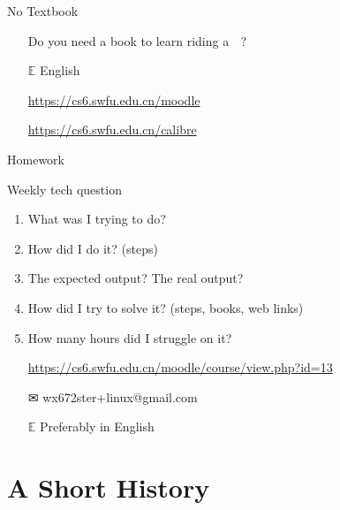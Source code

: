 \begin{frame}{No Textbook}%
  \begin{itemize}
  \item[\nerd{}] Do you need a book to learn riding a\hspace{.5ex} {\nerd } ?
  \item[{\GG}]\google
  \item[$\mathbb{E}$] {\purisa English}
  \item[\moodle] \url{https://cs6.swfu.edu.cn/moodle}
  \item[{\small\openbook}] \url{https://cs6.swfu.edu.cn/calibre}
  \end{itemize}
\end{frame}

\begin{frame}{Homework}
  \begin{block}{Weekly tech question}
    \begin{enumerate}
    \item What was I trying to do?
    \item How did I do it? (steps)
    \item The expected output? The real output?
    \item How did I try to solve it? (steps, books, web links)
    \item How many hours did I struggle on it?
    \end{enumerate}
  \end{block}
  \begin{itemize}
  \item[\moodle] \url{https://cs6.swfu.edu.cn/moodle/course/view.php?id=13}
  \item[\Large\dejavu ✉] \alert{\ttfamily wx672ster+linux@gmail.com}
  \item[$\mathbb{E}$] Preferably in English
  \end{itemize}
\end{frame}

\section[History]{A Short History}

